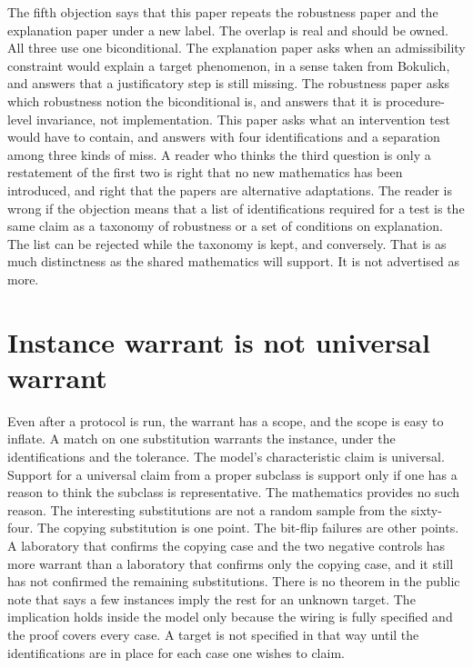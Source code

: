 \documentclass[11pt]{article}
\begin{document}
The fifth objection says that this paper repeats the robustness paper and the explanation paper under a new label. The overlap is real and should be owned. All three use one biconditional. The explanation paper asks when an admissibility constraint would explain a target phenomenon, in a sense taken from Bokulich, and answers that a justificatory step is still missing. The robustness paper asks which robustness notion the biconditional is, and answers that it is procedure-level invariance, not implementation. This paper asks what an intervention test would have to contain, and answers with four identifications and a separation among three kinds of miss. A reader who thinks the third question is only a restatement of the first two is right that no new mathematics has been introduced, and right that the papers are alternative adaptations. The reader is wrong if the objection means that a list of identifications required for a test is the same claim as a taxonomy of robustness or a set of conditions on explanation. The list can be rejected while the taxonomy is kept, and conversely. That is as much distinctness as the shared mathematics will support. It is not advertised as more.

\section{Instance warrant is not universal warrant}
\label{sec:instance}

Even after a protocol is run, the warrant has a scope, and the scope is easy to inflate. A match on one substitution warrants the instance, under the identifications and the tolerance. The model’s characteristic claim is universal. Support for a universal claim from a proper subclass is support only if one has a reason to think the subclass is representative. The mathematics provides no such reason. The interesting substitutions are not a random sample from the sixty-four. The copying substitution is one point. The bit-flip failures are other points. A laboratory that confirms the copying case and the two negative controls has more warrant than a laboratory that confirms only the copying case, and it still has not confirmed the remaining substitutions. There is no theorem in the public note that says a few instances imply the rest for an unknown target. The implication holds inside the model only because the wiring is fully specified and the proof covers every case. A target is not specified in that way until the identifications are in place for each case one wishes to claim.
\end{document}
